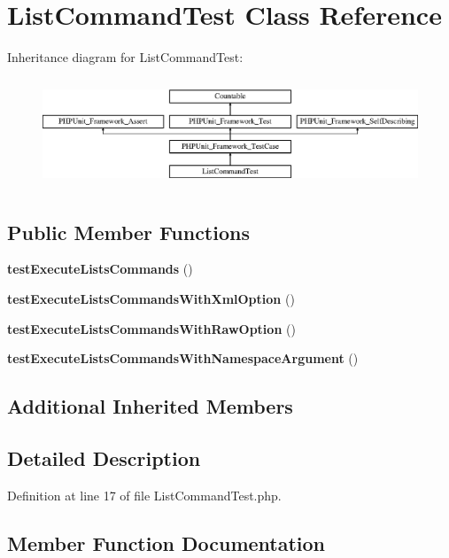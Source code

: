 \section{List\+Command\+Test Class Reference}
\label{class_symfony_1_1_component_1_1_console_1_1_tests_1_1_command_1_1_list_command_test}
Inheritance diagram for List\+Command\+Test\+:\begin{figure}[H]
\begin{center}
\leavevmode
\includegraphics[height=3.303835cm]{class_symfony_1_1_component_1_1_console_1_1_tests_1_1_command_1_1_list_command_test}
\end{center}
\end{figure}
\subsection*{Public Member Functions}
\begin{DoxyCompactItemize}
\item 
{\bf test\+Execute\+Lists\+Commands} ()
\item 
{\bf test\+Execute\+Lists\+Commands\+With\+Xml\+Option} ()
\item 
{\bf test\+Execute\+Lists\+Commands\+With\+Raw\+Option} ()
\item 
{\bf test\+Execute\+Lists\+Commands\+With\+Namespace\+Argument} ()
\end{DoxyCompactItemize}
\subsection*{Additional Inherited Members}


\subsection{Detailed Description}


Definition at line 17 of file List\+Command\+Test.\+php.



\subsection{Member Function Documentation}
